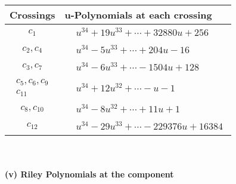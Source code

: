 \documentclass[1p]{elsarticle_modified}
\theoremstyle{definition}
\begin{document}
\begin{tabular}{m{50pt}|m{274pt}}
Crossings & \hspace{64pt}u-Polynomials at each crossing \\
\hline $$\begin{aligned}c_{1}\end{aligned}$$&$\begin{aligned}
&u^{34}+19 u^{33}+\cdots+32880 u+256
\end{aligned}$\\
\hline $$\begin{aligned}c_{2},c_{4}\end{aligned}$$&$\begin{aligned}
&u^{34}-5 u^{33}+\cdots+204 u-16
\end{aligned}$\\
\hline $$\begin{aligned}c_{3},c_{7}\end{aligned}$$&$\begin{aligned}
&u^{34}-6 u^{33}+\cdots-1504 u+128
\end{aligned}$\\
\hline $$\begin{aligned}c_{5},c_{6},c_{9}\\c_{11}\end{aligned}$$&$\begin{aligned}
&u^{34}+12 u^{32}+\cdots- u-1
\end{aligned}$\\
\hline $$\begin{aligned}c_{8},c_{10}\end{aligned}$$&$\begin{aligned}
&u^{34}-8 u^{32}+\cdots+11 u+1
\end{aligned}$\\
\hline $$\begin{aligned}c_{12}\end{aligned}$$&$\begin{aligned}
&u^{34}-29 u^{33}+\cdots-229376 u+16384
\end{aligned}$\\
\hline
\end{tabular}\\~\\
\newpage\renewcommand{\arraystretch}{1}
\flushleft \textbf{(v) Riley Polynomials at the component}\newline \\
\end{document}
